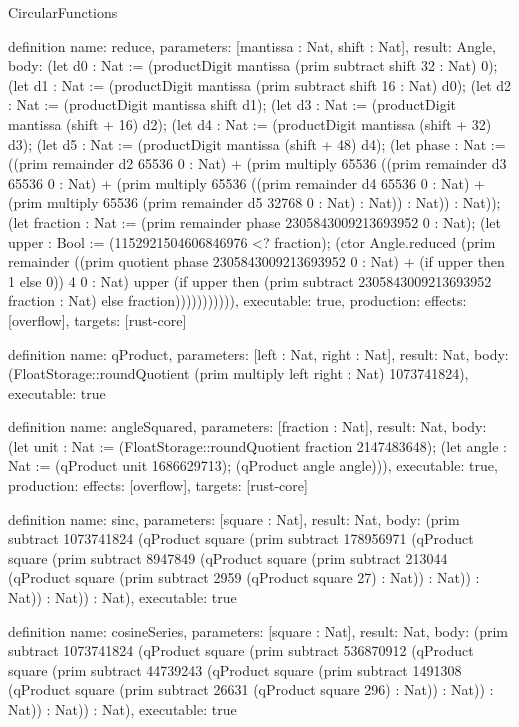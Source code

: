 \begin{lexlean}{CircularFunctions}
\begin{semanticmodule}
definition{
  name: reduce,
  parameters: [mantissa : Nat, shift : Nat],
  result: Angle,
  body: (let d0 : Nat := (productDigit mantissa (prim subtract shift 32 : Nat) 0); (let d1 : Nat := (productDigit mantissa (prim subtract shift 16 : Nat) d0); (let d2 : Nat := (productDigit mantissa shift d1); (let d3 : Nat := (productDigit mantissa (shift + 16) d2); (let d4 : Nat := (productDigit mantissa (shift + 32) d3); (let d5 : Nat := (productDigit mantissa (shift + 48) d4); (let phase : Nat := ((prim remainder d2 65536 0 : Nat) + (prim multiply 65536 ((prim remainder d3 65536 0 : Nat) + (prim multiply 65536 ((prim remainder d4 65536 0 : Nat) + (prim multiply 65536 (prim remainder d5 32768 0 : Nat) : Nat)) : Nat)) : Nat)); (let fraction : Nat := (prim remainder phase 2305843009213693952 0 : Nat); (let upper : Bool := (1152921504606846976 <? fraction); (ctor Angle.reduced (prim remainder ((prim quotient phase 2305843009213693952 0 : Nat) + (if upper then 1 else 0)) 4 0 : Nat) upper (if upper then (prim subtract 2305843009213693952 fraction : Nat) else fraction))))))))))),
  executable: true,
  production: {effects: [overflow], targets: [rust-core]}
}

definition{
  name: qProduct,
  parameters: [left : Nat, right : Nat],
  result: Nat,
  body: (FloatStorage::roundQuotient (prim multiply left right : Nat) 1073741824),
  executable: true
}

definition{
  name: angleSquared,
  parameters: [fraction : Nat],
  result: Nat,
  body: (let unit : Nat := (FloatStorage::roundQuotient fraction 2147483648); (let angle : Nat := (qProduct unit 1686629713); (qProduct angle angle))),
  executable: true,
  production: {effects: [overflow], targets: [rust-core]}
}

definition{
  name: sinc,
  parameters: [square : Nat],
  result: Nat,
  body: (prim subtract 1073741824 (qProduct square (prim subtract 178956971 (qProduct square (prim subtract 8947849 (qProduct square (prim subtract 213044 (qProduct square (prim subtract 2959 (qProduct square 27) : Nat)) : Nat)) : Nat)) : Nat)) : Nat),
  executable: true
}

definition{
  name: cosineSeries,
  parameters: [square : Nat],
  result: Nat,
  body: (prim subtract 1073741824 (qProduct square (prim subtract 536870912 (qProduct square (prim subtract 44739243 (qProduct square (prim subtract 1491308 (qProduct square (prim subtract 26631 (qProduct square 296) : Nat)) : Nat)) : Nat)) : Nat)) : Nat),
  executable: true
}


\end{semanticmodule}
\end{lexlean}
